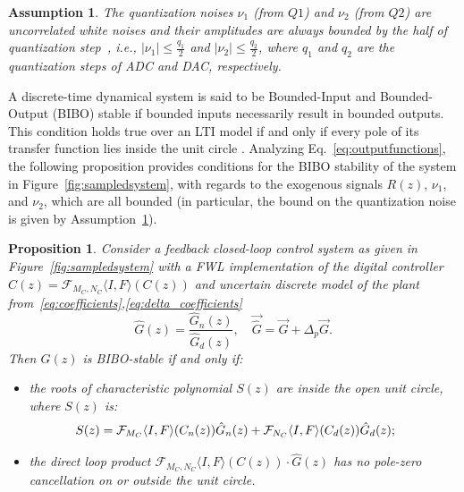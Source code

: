 \documentclass[final]{sig-alternate-05-2015}
\newtheorem{myassumption}{Assumption}
\newtheorem{myprop}{Proposition}
\begin{document}
\begin{myassumption}
\label{whitenoise}
%
The quantization noises $\nu_{1}$ (from $Q1$) and $\nu_{2}$ (from $Q2$) are
uncorrelated white noises and their amplitudes are always bounded by the
half of quantization step~\cite{astrom1997computer}, i.e., $\vert \nu_{1}
\vert \leq \frac{q_{1}}{2}$ and $\vert \nu_{2} \vert \leq \frac{q_{2}}{2}$,
where $q_{1}$ and $q_{2}$ are the quantization steps of ADC and DAC, respectively.
% 
\end{myassumption}

A discrete-time dynamical system is said to be Bounded-Input and Bounded-Output
(BIBO) stable if bounded inputs necessarily result in bounded outputs. 
This condition holds true over an LTI model if and only if every pole of its transfer function lies inside the unit circle \cite{Astrom08}.  
Analyzing Eq.~\eqref{eq:outputfunctions}, 
the following proposition provides conditions for the BIBO stability of the system in Figure~\ref{fig:sampledsystem}, 
with regards to the exogenous signals $R(z)$, $\nu_{1}$, and $\nu_{2}$, which are all bounded 
(in particular, the bound on the quantization noise is given by
Assumption~\ref{whitenoise}). 
%
\begin{myprop}{\cite{Bessa16,fadali}}
\label{prop:eq_int_stab} 
%
Consider a feedback closed-loop control system as given in
Figure~\ref{fig:sampledsystem} with a FWL implementation of the digital
controller $\hat{C}(z) =\mathcal{F}_{M_C,N_C}\langle I,F \rangle(C(z))$ and uncertain discrete
model of the plant from~\eqref{eq:coefficients},\eqref{eq:delta_coefficients} 
%
$$
\hat{G}(z) =\frac{\hat{G}_n(z)}{\hat{G}_d(z)}, \quad \vec{\hat{G}}=\vec{G}+\Delta_p \vec{G}.
$$
%
Then $\hat{G}(z)$ is BIBO-stable if and only if:
%
\begin{itemize}
\item  the roots of characteristic polynomial $S(z)$ are inside the open unit circle, where $S(z)$ is:
\begin{equation}
\label{eq:internal_stab_lemma}
\hspace{-3ex} S(z)=\mathcal{F}_{M_C}\langle I,F \rangle(C_n(z))\hat{G}_n(z)+\mathcal{F}_{N_C}\langle I,F \rangle(C_d(z))\hat{G}_d(z);
\end{equation}
\item the direct loop product $\mathcal{F}_{M_C,N_C}\langle I,F \rangle(C(z))\cdot \hat{G}(z)$ has no pole-zero cancellation on or outside the unit circle.
\end{itemize}
\end{myprop}
\end{document}
